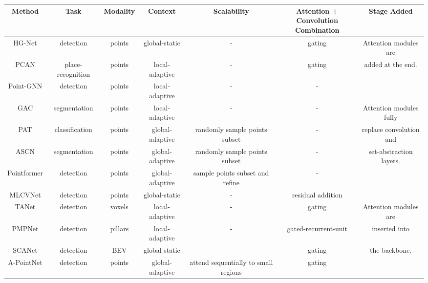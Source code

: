 \documentclass[10pt,twocolumn,letterpaper]{article}
\begin{document}
\setlength{\tabcolsep}{1.7pt}
\begin{table*}[t]
\footnotesize
    \centering
    \begin{tabular*}{\textwidth}{c|c|c|c|c|c|c}
        \hline
        Method & Task & Modality & Context & Scalability & \makecell{Attention + Convolution \\ Combination} & Stage Added    \\
        \hline
        HG-Net \cite{hgnet} & detection & points &  global-static & - & gating &  Attention modules are    \\
        PCAN \cite{pcan} & place-recognition & points & local-adaptive & - & gating &  added at the end. \\ 
        \hline
        
        
        Point-GNN \cite{pointgnn} & detection & points & local-adaptive & - & - & \\ 
        GAC \cite{gac} & segmentation & points & local-adaptive & - & - & Attention modules fully  \\
         PAT \cite{pat} & classification & points & global-adaptive & randomly sample points subset & - & replace convolution and \\
        ASCN \cite{ascn} & segmentation & points & global-adaptive & randomly sample points subset & - & set-abstraction layers. \\
        Pointformer \cite{pointformer} & detection & points & global-adaptive &  sample points subset and refine  & - & \\
        \hline
        
        
        MLCVNet \cite{mlcv} & detection & points & global-static & - & residual addition & \\
        TANet \cite{tanet} & detection & voxels & local-adaptive & - & gating & Attention modules are \\
        PMPNet \cite{pmpnet} & detection & pillars & local-adaptive & - & gated-recurrent-unit &  inserted into \\
        SCANet \cite{scanet} & detection & BEV & global-static & - & gating & the backbone. \\
        A-PointNet \cite{a-pointnet} & detection & points & global-adaptive & attend sequentially to small regions & gating &  \\
        \hline
        

\end{tabular*}
\end{table*}
\end{document}
